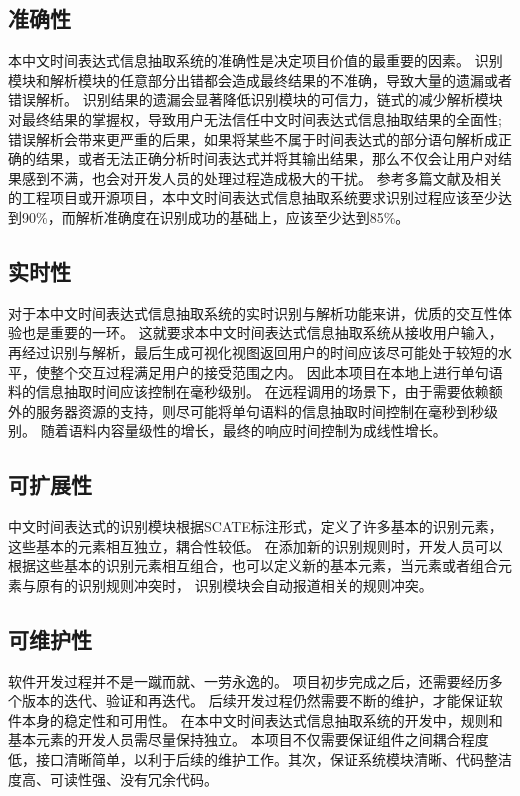 \subsection{准确性}

本中文时间表达式信息抽取系统的准确性是决定项目价值的最重要的因素。 
识别模块和解析模块的任意部分出错都会造成最终结果的不准确，导致大量的遗漏或者错误解析。 
识别结果的遗漏会显著降低识别模块的可信力，链式的减少解析模块对最终结果的掌握权，导致用户无法信任中文时间表达式信息抽取结果的全面性;
错误解析会带来更严重的后果，如果将某些不属于时间表达式的部分语句解析成正确的结果，或者无法正确分析时间表达式并将其输出结果，那么不仅会让用户对结果感到不满，也会对开发人员的处理过程造成极大的干扰。 
参考多篇文献及相关的工程项目或开源项目，本中文时间表达式信息抽取系统要求识别过程应该至少达到90\%，而解析准确度在识别成功的基础上，应该至少达到85\%。

\subsection{实时性}

对于本中文时间表达式信息抽取系统的实时识别与解析功能来讲，优质的交互性体验也是重要的一环。 
这就要求本中文时间表达式信息抽取系统从接收用户输入，再经过识别与解析，最后生成可视化视图返回用户的时间应该尽可能处于较短的水平，使整个交互过程满足用户的接受范围之内。
因此本项目在本地上进行单句语料的信息抽取时间应该控制在毫秒级别。 
在远程调用的场景下，由于需要依赖额外的服务器资源的支持，则尽可能将单句语料的信息抽取时间控制在毫秒到秒级别。 
随着语料内容量级性的增长，最终的响应时间控制为成线性增长。

\subsection{可扩展性}

中文时间表达式的识别模块根据SCATE标注形式，定义了许多基本的识别元素，这些基本的元素相互独立，耦合性较低。 
在添加新的识别规则时，开发人员可以根据这些基本的识别元素相互组合，也可以定义新的基本元素，当元素或者组合元素与原有的识别规则冲突时，
识别模块会自动报道相关的规则冲突。


\subsection{可维护性}

软件开发过程并不是一蹴而就、一劳永逸的。 项目初步完成之后，还需要经历多个版本的迭代、验证和再迭代。 
后续开发过程仍然需要不断的维护，才能保证软件本身的稳定性和可用性。
在本中文时间表达式信息抽取系统的开发中，规则和基本元素的开发人员需尽量保持独立。
本项目不仅需要保证组件之间耦合程度低，接口清晰简单，以利于后续的维护工作。其次，保证系统模块清晰、代码整洁度高、可读性强、没有冗余代码。

